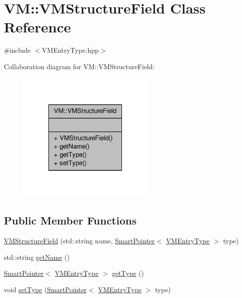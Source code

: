 \hypertarget{class_v_m_1_1_v_m_structure_field}{\section{V\-M\-:\-:V\-M\-Structure\-Field Class Reference}
\label{class_v_m_1_1_v_m_structure_field}
}


{\ttfamily \#include $<$V\-M\-Entry\-Type.\-hpp$>$}



Collaboration diagram for V\-M\-:\-:V\-M\-Structure\-Field\-:
\nopagebreak
\begin{figure}[H]
\begin{center}
\leavevmode
\includegraphics[width=192pt]{class_v_m_1_1_v_m_structure_field__coll__graph}
\end{center}
\end{figure}
\subsection*{Public Member Functions}
\begin{DoxyCompactItemize}
\item 
\hyperlink{class_v_m_1_1_v_m_structure_field_a44d42e3f26403a7d9b909f215a1f6f19}{V\-M\-Structure\-Field} (std\-::string name, \hyperlink{_smart_pointer_8hpp_afdd8d4ba81c3fcbdeacf1dafba2accfb}{Smart\-Pointer}$<$ \hyperlink{class_v_m_1_1_v_m_entry_type}{V\-M\-Entry\-Type} $>$ type)
\item 
std\-::string \hyperlink{class_v_m_1_1_v_m_structure_field_aaaad2973e28ce448112892125df2994c}{get\-Name} ()
\item 
\hyperlink{_smart_pointer_8hpp_afdd8d4ba81c3fcbdeacf1dafba2accfb}{Smart\-Pointer}$<$ \hyperlink{class_v_m_1_1_v_m_entry_type}{V\-M\-Entry\-Type} $>$ \hyperlink{class_v_m_1_1_v_m_structure_field_ad686a68c733805ba1ed330886ef78b43}{get\-Type} ()
\item 
void \hyperlink{class_v_m_1_1_v_m_structure_field_a0e05c782e52de8e3ed8ecb7b96fc4cf3}{set\-Type} (\hyperlink{_smart_pointer_8hpp_afdd8d4ba81c3fcbdeacf1dafba2accfb}{Smart\-Pointer}$<$ \hyperlink{class_v_m_1_1_v_m_entry_type}{V\-M\-Entry\-Type} $>$ type)
\end{DoxyCompactItemize}



